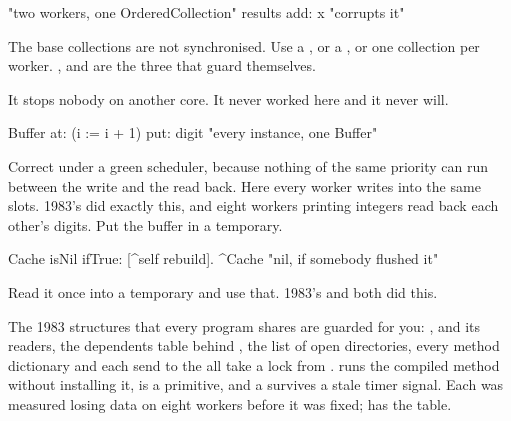 \begin{stwarn}
\begin{st}
"two workers, one OrderedCollection"
results add: x                            "corrupts it"
\end{st}
The base collections are not synchronised. Use a , or a
, or one collection per worker. , 
and  are the three that guard themselves.
\end{stwarn}

\begin{stwarn}
It stops nobody on another core. It never worked here and it never will.
\end{stwarn}

\begin{stwarn}
\begin{st}
Buffer at: (i := i + 1) put: digit       "every instance, one Buffer"
\end{st}
Correct under a green scheduler, because nothing of the same priority can
run between the write and the read back. Here every worker writes into the
same slots. 1983's  did exactly this, and
eight workers printing integers read back each other's digits. Put the
buffer in a temporary.
\end{stwarn}

\begin{stwarn}
\begin{st}
Cache isNil ifTrue: [^self rebuild].
^Cache                                   "nil, if somebody flushed it"
\end{st}
Read it once into a temporary and use that. 1983's  and
 both did this.
\end{stwarn}

\begin{stnote}
The 1983 structures that every program shares are guarded for you:
,  and its readers, the dependents
table behind , the list of open directories, every method
dictionary and each send to the  all take a lock from
. 
runs the compiled method without installing it,  is a
primitive, and a  survives a stale timer signal. Each was measured
losing data on eight workers before it was fixed;  has
the table.
\end{stnote}

